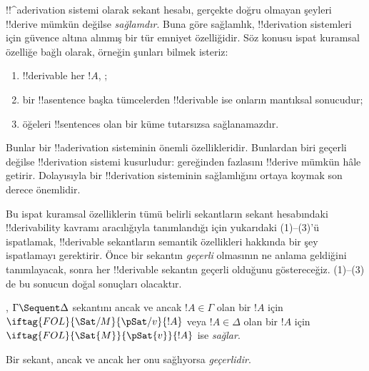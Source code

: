 

      {}
      {}


\begin{explain}
!!^a{derivation} sistemi olarak sekant hesabı, gerçekte doğru olmayan
şeyleri !!{derive} mümkün değilse \emph{sağlamdır}. Buna göre sağlamlık,
!!{derivation} sistemleri için güvence altına alınmış bir tür emniyet
özelliğidir. Söz konusu ispat kuramsal özelliğe bağlı olarak, örneğin şunları
bilmek isteriz:
\begin{enumerate}
\item !!{derivable} her $!A$, ;
\item bir !!a{sentence} başka tümcelerden !!{derivable} ise onların mantıksal
  sonucudur;
\item öğeleri !!{sentence}s olan bir küme tutarsızsa sağlanamazdır.
\end{enumerate}
Bunlar bir !!a{derivation} sisteminin önemli özellikleridir. Bunlardan biri
geçerli değilse !!{derivation} sistemi kusurludur: gereğinden fazlasını
!!{derive} mümkün hâle getirir. Dolayısıyla bir !!{derivation} sisteminin sağlamlığını ortaya
koymak son derece önemlidir.

Bu ispat kuramsal özelliklerin tümü belirli sekantların sekant hesabındaki
!!{derivability} kavramı aracılığıyla tanımlandığı için yukarıdaki (1)--(3)'ü
ispatlamak, !!{derivable} sekantların semantik özellikleri hakkında bir şey
ispatlamayı gerektirir. Önce bir sekantın \emph{geçerli} olmasının ne anlama
geldiğini tanımlayacak, sonra her !!{derivable} sekantın geçerli olduğunu
göstereceğiz. (1)--(3) de bu sonucun doğal sonuçları olacaktır.
\end{explain}

\begin{defn}
,
  $\Gamma\Sequent\Delta$ sekantını ancak ve ancak $!A\in\Gamma$ olan bir
  $!A$ için $\iftag{FOL}{\Sat/{M}}{\pSat/{v}}{!A}$ veya $!A\in\Delta$ olan
  bir $!A$ için $\iftag{FOL}{\Sat{M}}{\pSat{v}}{!A}$ ise \emph{sağlar}.

Bir sekant, ancak ve ancak her  onu sağlıyorsa \emph{geçerlidir}.
\end{defn}

